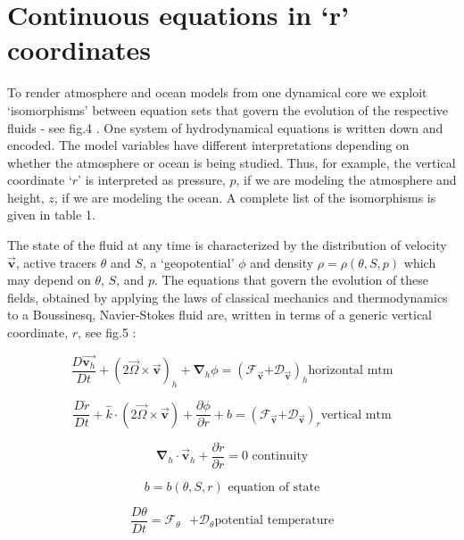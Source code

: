 
\section{Continuous equations in `r' coordinates}

To render atmosphere and ocean models from one dynamical core we exploit
`isomorphisms' between equation sets that govern the evolution of the
respective fluids - see fig.4
. One system of hydrodynamical equations is written down
and encoded. The model variables have different interpretations depending on
whether the atmosphere or ocean is being studied. Thus, for example, the
vertical coordinate `$r$' is interpreted as pressure, $p$, if we are
modeling the atmosphere and height, $z$, if we are modeling the ocean. A
complete list of the isomorphisms is given in table 1.

The state of the fluid at any time is characterized by the distribution of
velocity $\vec{\mathbf{v}}$, active tracers $\theta $ and $S$, a
`geopotential' $\phi $ and density $\rho =\rho (\theta ,S,p)$ which may
depend on $\theta $, $S$, and $p$. The equations that govern the evolution
of these fields, obtained by applying the laws of classical mechanics and
thermodynamics to a Boussinesq, Navier-Stokes fluid are, written in terms of
a generic vertical coordinate, $r$, see fig.5
:

\[
\frac{D\vec{\mathbf{v}_{h}}}{Dt}+\left( 2\vec{\Omega}\times \vec{\mathbf{v}}
\right) _{h}+\mathbf{\nabla }_{h}\phi =\left( \mathcal{F}_{\vec{\mathbf{v}}}
\mathcal{+D}_{\vec{\mathbf{v}}}\right) _{h}\text{horizontal mtm} 
\]

\[
\frac{D\dot{r}}{Dt}+\widehat{k}\cdot \left( 2\vec{\Omega}\times \vec{\mathbf{
v}}\right) +\frac{\partial \phi }{\partial r}+b=\left( \mathcal{F}_{\vec{
\mathbf{v}}}\mathcal{+D}_{\vec{\mathbf{v}}}\right) _{r}\text{vertical mtm} 
\]

\begin{equation}
\mathbf{\nabla }_{h}\cdot \vec{\mathbf{v}}_{h}+\frac{\partial \dot{r}}{
\partial r}=0\text{ continuity}  \label{incompressible}
\end{equation}

\[
b=b(\theta ,S,r)\text{ equation of state} 
\]

\[
\frac{D\theta }{Dt}=\mathcal{F}_{\theta }\text{ }\mathcal{+D}_{\theta }\text{
potential temperature} 
\]

